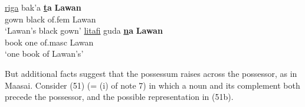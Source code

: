 \documentclass[output=paper
,modfonts
,nonflat]{langsci/langscibook}
\begin{document}
\begin{exe}
	 \citep[301]{Newman2000}
	\xlist
	\ex 
	\gll \underline{riga}   bak’a   \textbf{\underline{t}a}       \textbf{Lawan} \\
	gown   black   of.fem    Lawan\\
	\glt `Lawan’s black gown'  	
	\ex 
	\gll \underline{litafi}     guda \textbf{\underline{n}a}       \textbf{Lawan}\\
	book one  of.masc  Lawan\\
	\glt `one book of Lawan's'
	\endxlist
\end{exe}
But additional facts suggest that the possessum raises across the possessor, as in Maasai.  Consider (51) (= (i) of note 7) in which a noun and its complement both precede the possessor, and the possible representation in (51b). 
\end{document}
